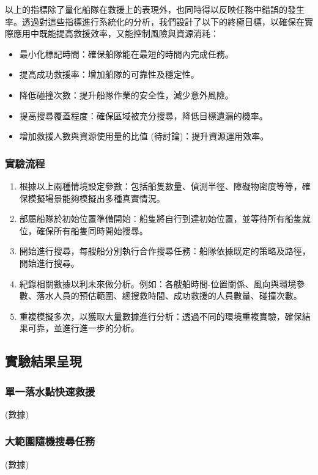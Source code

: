 \documentclass[12pt,a4paper]{article}
\begin{document}
以上的指標除了量化船隊在救援上的表現外，也同時得以反映任務中錯誤的發生率。透過對這些指標進行系統化的分析，我們設計了以下的終極目標，以確保在實際應用中既能提高救援效率，又能控制風險與資源消耗：
\begin{itemize}
    \item 最小化標記時間：確保船隊能在最短的時間內完成任務。
    \item 提高成功救援率：增加船隊的可靠性及穩定性。
    \item 降低碰撞次數：提升船隊作業的安全性，減少意外風險。
    \item 提高搜尋覆蓋程度：確保區域被充分搜尋，降低目標遺漏的機率。
    \item 增加救援人數與資源使用量的比值 (待討論)：提升資源運用效率。
\end{itemize}

\subsubsection{實驗流程}
\begin{enumerate}
    \item 根據以上兩種情境設定參數：包括船隻數量、偵測半徑、障礙物密度等等，確保模擬場景能夠模擬出多種真實情況。
    \item 部屬船隊於初始位置準備開始：船隻將自行到達初始位置，並等待所有船隻就位，確保所有船隻同時開始搜尋。
    \item 開始進行搜尋，每艘船分別執行合作搜尋任務：船隊依據既定的策略及路徑，開始進行搜尋。
    \item 紀錄相關數據以利未來做分析。例如：各艘船時間-位置關係、風向與環境參數、落水人員的預估範圍、總搜救時間、成功救援的人員數量、碰撞次數。
    \item 重複模擬多次，以獲取大量數據進行分析：透過不同的環境重複實驗，確保結果可靠，並進行進一步的分析。
\end{enumerate}

\subsection{實驗結果呈現}
\subsubsection{單一落水點快速救援}
(數據)

\subsubsection{大範圍隨機搜尋任務}
(數據)
\end{document}
